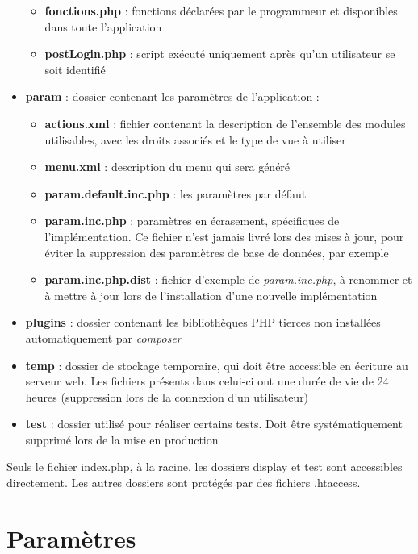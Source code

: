 \begin{itemize}
\begin{itemize}
\item \textbf{fonctions.php} : fonctions déclarées par le programmeur et disponibles dans toute l'application 
\item \textbf{postLogin.php} : script exécuté uniquement après qu'un utilisateur se soit identifié
\end{itemize}
\item \textbf{param} : dossier contenant les paramètres de l'application :
\begin{itemize}
\item \textbf{actions.xml} : fichier contenant la description de l'ensemble des modules utilisables, avec les droits associés et le type de vue à utiliser
\item \textbf{menu.xml} : description du menu qui sera généré
\item \textbf{param.default.inc.php} : les paramètres par défaut
\item \textbf{param.inc.php} : paramètres en écrasement, spécifiques de l'implémentation. Ce fichier n'est jamais livré lors des mises à jour, pour éviter la suppression des paramètres de base de données, par exemple
\item \textbf{param.inc.php.dist} : fichier d'exemple de \textit{param.inc.php}, à renommer et à mettre à jour lors de l'installation d'une nouvelle implémentation
\end{itemize}
\item \textbf{plugins} : dossier contenant les bibliothèques PHP tierces non installées automatiquement par \textit{composer}
\item \textbf{temp} : dossier de stockage temporaire, qui doit être accessible en écriture au serveur web. Les fichiers présents dans celui-ci ont une durée de vie de 24 heures (suppression lors de la connexion d'un utilisateur)
\item \textbf{test} : dossier utilisé pour réaliser certains tests. Doit être systématiquement supprimé lors de la mise en production
\end{itemize}

Seuls le fichier index.php, à la racine, les dossiers display et test sont accessibles directement. Les autres dossiers sont protégés par des fichiers .htaccess.

\section{Paramètres}\label{param}

